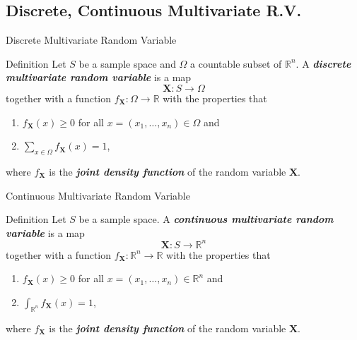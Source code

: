 \documentclass{beamer}
\newcommand{\bb}[1]{\textcolor{antiquefuchsia}{\textbf{\textit{#1}}}}
\begin{document}
\subsection{Discrete, Continuous Multivariate R.V.}
\begin{frame}{Discrete Multivariate Random Variable}
\begin{block}{Definition}
Let $S$ be a sample space and $\Omega$ a countable subset of $\mathbb{R}^{n}$. A \bb{discrete multivariate random variable} is a map
$$
\mathbf{X}: S \rightarrow \Omega
$$
together with a function $f_{\mathbf{X}}: \Omega \rightarrow \mathbb{R}$ with the properties that
\begin{enumerate}
\item $f_{\mathbf{X}}(x) \geq 0$ for all $x=\left(x_{1}, \ldots, x_{n}\right) \in \Omega$ and
\item $\sum_{x \in \Omega} f_{\mathbf{X}}(x)=1$,
\end{enumerate}
where $f_{\mathbf{X}}$ is the \bb{joint density function} of the random variable $\mathbf{X}$.
\end{block}
\end{frame}

\begin{frame}{Continuous Multivariate Random Variable}
\begin{block}{Definition}
Let $S$ be a sample space. A \bb{continuous multivariate random variable} is a map
$$
\mathbf{X}: S \rightarrow \mathbb{R}^{n}
$$
together with a function $f_{\mathbf{X}}: \mathbb{R}^{n} \rightarrow \mathbb{R}$ with the properties that
\begin{enumerate}
\item $f_{\mathbf{X}}(x) \geq 0$ for all $x=\left(x_{1}, \ldots, x_{n}\right) \in \mathbb{R}^{n}$ and
\item $\int_{\mathbb{R}^{n}} f_{\mathbf{X}}(x)=1$,
\end{enumerate}
where $f_{\mathbf{X}}$ is the \bb{joint density function} of the random variable $\mathbf{X}$.
\end{block}
\end{frame}
\end{document}
